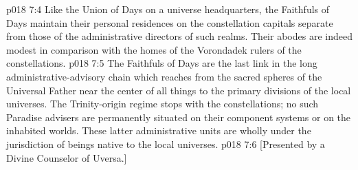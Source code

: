 \vs p018 7:4 Like the Union of Days on a universe headquarters, the Faithfuls of Days maintain their personal residences on the constellation capitals separate from those of the administrative directors of such realms. Their abodes are indeed modest in comparison with the homes of the Vorondadek rulers of the constellations.
\vs p018 7:5 The Faithfuls of Days are the last link in the long administrative\hyp{}advisory chain which reaches from the sacred spheres of the Universal Father near the center of all things to the primary divisions of the local universes. The Trinity\hyp{}origin regime stops with the constellations; no such Paradise advisers are permanently situated on their component systems or on the inhabited worlds. These latter administrative units are wholly under the jurisdiction of beings native to the local universes.
\vsetoff
\vs p018 7:6 [Presented by a Divine Counselor of Uversa.]
